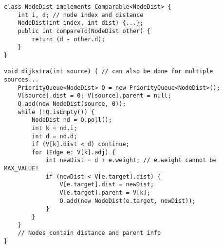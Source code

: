 \documentclass[8pt,a4paper,landscape,oneside]{amsart}
\begin{document}
\begin{multicols*}{3}
\begin{verbatim}
class NodeDist implements Comparable<NodeDist> {
    int i, d; // node index and distance
    NodeDist(int index, int dist) {...};
    public int compareTo(NodeDist other) {
        return (d - other.d);
    }
}

void dijkstra(int source) { // can also be done for multiple sources...
    PriorityQueue<NodeDist> Q = new PriorityQueue<NodeDist>();
    V[source].dist = 0; V[source].parent = null;
    Q.add(new NodeDist(source, 0));
    while (!Q.isEmpty()) {
        NodeDist nd = Q.poll();
        int k = nd.i;
        int d = nd.d;
        if (V[k].dist < d) continue;
        for (Edge e: V[k].adj) {
            int newDist = d + e.weight; // e.weight cannot be MAX_VALUE!
            if (newDist < V[e.target].dist) {
                V[e.target].dist = newDist;
                V[e.target].parent = V[k];
                Q.add(new NodeDist(e.target, newDist));
            }
        }
    }
    // Nodes contain distance and parent info
}
\end{verbatim}

\end{multicols*}
\end{document}
